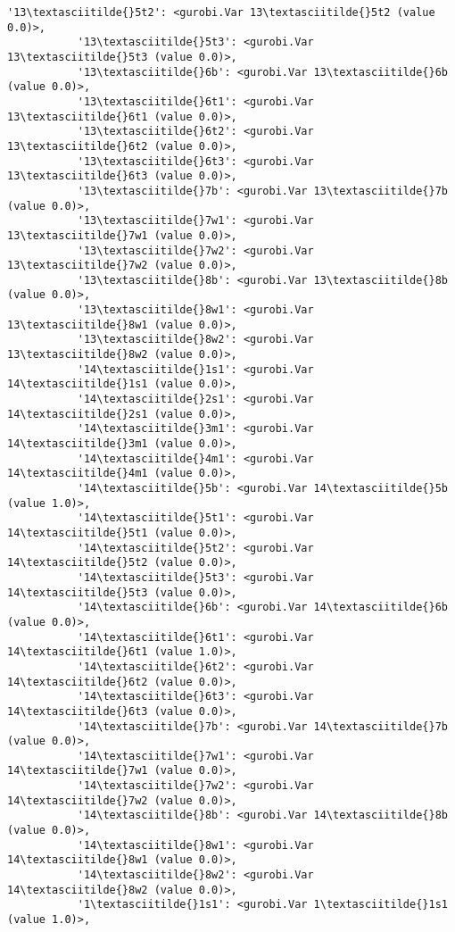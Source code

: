 \documentclass[11pt]{article}
\begin{document}
\begin{Verbatim}[commandchars=\\\{\}]
           '13\textasciitilde{}5t2': <gurobi.Var 13\textasciitilde{}5t2 (value 0.0)>,
           '13\textasciitilde{}5t3': <gurobi.Var 13\textasciitilde{}5t3 (value 0.0)>,
           '13\textasciitilde{}6b': <gurobi.Var 13\textasciitilde{}6b (value 0.0)>,
           '13\textasciitilde{}6t1': <gurobi.Var 13\textasciitilde{}6t1 (value 0.0)>,
           '13\textasciitilde{}6t2': <gurobi.Var 13\textasciitilde{}6t2 (value 0.0)>,
           '13\textasciitilde{}6t3': <gurobi.Var 13\textasciitilde{}6t3 (value 0.0)>,
           '13\textasciitilde{}7b': <gurobi.Var 13\textasciitilde{}7b (value 0.0)>,
           '13\textasciitilde{}7w1': <gurobi.Var 13\textasciitilde{}7w1 (value 0.0)>,
           '13\textasciitilde{}7w2': <gurobi.Var 13\textasciitilde{}7w2 (value 0.0)>,
           '13\textasciitilde{}8b': <gurobi.Var 13\textasciitilde{}8b (value 0.0)>,
           '13\textasciitilde{}8w1': <gurobi.Var 13\textasciitilde{}8w1 (value 0.0)>,
           '13\textasciitilde{}8w2': <gurobi.Var 13\textasciitilde{}8w2 (value 0.0)>,
           '14\textasciitilde{}1s1': <gurobi.Var 14\textasciitilde{}1s1 (value 0.0)>,
           '14\textasciitilde{}2s1': <gurobi.Var 14\textasciitilde{}2s1 (value 0.0)>,
           '14\textasciitilde{}3m1': <gurobi.Var 14\textasciitilde{}3m1 (value 0.0)>,
           '14\textasciitilde{}4m1': <gurobi.Var 14\textasciitilde{}4m1 (value 0.0)>,
           '14\textasciitilde{}5b': <gurobi.Var 14\textasciitilde{}5b (value 1.0)>,
           '14\textasciitilde{}5t1': <gurobi.Var 14\textasciitilde{}5t1 (value 0.0)>,
           '14\textasciitilde{}5t2': <gurobi.Var 14\textasciitilde{}5t2 (value 0.0)>,
           '14\textasciitilde{}5t3': <gurobi.Var 14\textasciitilde{}5t3 (value 0.0)>,
           '14\textasciitilde{}6b': <gurobi.Var 14\textasciitilde{}6b (value 0.0)>,
           '14\textasciitilde{}6t1': <gurobi.Var 14\textasciitilde{}6t1 (value 1.0)>,
           '14\textasciitilde{}6t2': <gurobi.Var 14\textasciitilde{}6t2 (value 0.0)>,
           '14\textasciitilde{}6t3': <gurobi.Var 14\textasciitilde{}6t3 (value 0.0)>,
           '14\textasciitilde{}7b': <gurobi.Var 14\textasciitilde{}7b (value 0.0)>,
           '14\textasciitilde{}7w1': <gurobi.Var 14\textasciitilde{}7w1 (value 0.0)>,
           '14\textasciitilde{}7w2': <gurobi.Var 14\textasciitilde{}7w2 (value 0.0)>,
           '14\textasciitilde{}8b': <gurobi.Var 14\textasciitilde{}8b (value 0.0)>,
           '14\textasciitilde{}8w1': <gurobi.Var 14\textasciitilde{}8w1 (value 0.0)>,
           '14\textasciitilde{}8w2': <gurobi.Var 14\textasciitilde{}8w2 (value 0.0)>,
           '1\textasciitilde{}1s1': <gurobi.Var 1\textasciitilde{}1s1 (value 1.0)>,

\end{Verbatim}
\end{document}
